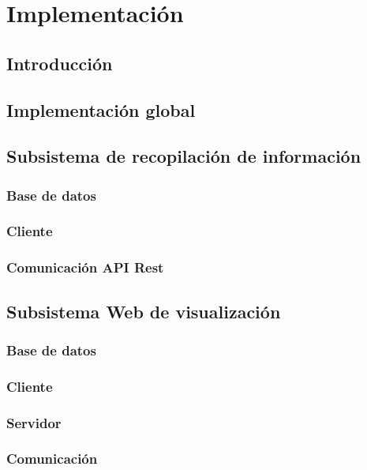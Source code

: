 \section{Implementación}

\subsection{Introducción}
 
\subsection{Implementación global}

\subsection{Subsistema de recopilación de información}
	\subsubsection{Base de datos}
	\subsubsection{Cliente}
	\subsubsection{Comunicación API Rest}

\subsection{Subsistema Web de visualización}
	\subsubsection{Base de datos}
	\subsubsection{Cliente}
	\subsubsection{Servidor}
	\subsubsection{Comunicación}

\newpage



